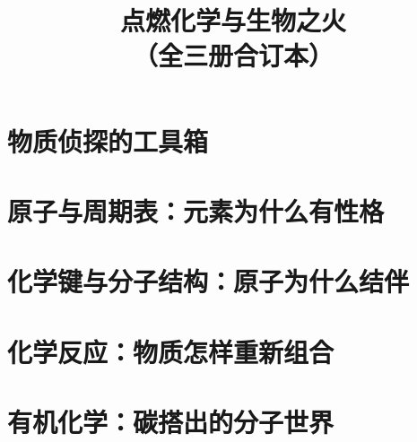 \documentclass[12pt,openany,fontset=none,UTF8,scheme=chinese]{ctexbook}
\title{点燃化学与生物之火\\（全三册合订本）}
\author{}
\date{}
\begin{document}
\frontmatter
\maketitle



\tableofcontents

\mainmatter

\part{物质侦探的工具箱}






\part{原子与周期表：元素为什么有性格}












\part{化学键与分子结构：原子为什么结伴}










\part{化学反应：物质怎样重新组合}













\part{有机化学：碳搭出的分子世界}









\end{document}
